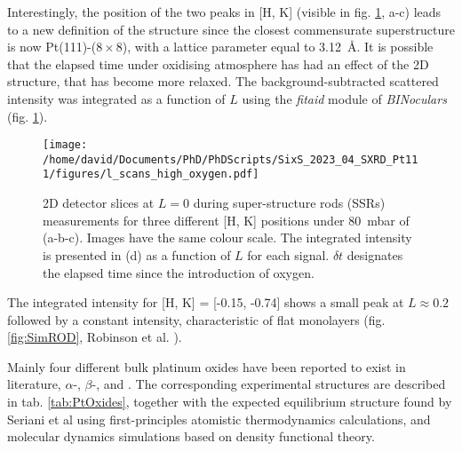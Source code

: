 Interestingly, the position of the two peaks in [H, K] (visible in fig. \ref{fig:LScans80}, a-c) leads to a new definition of the structure since the closest commensurate superstructure is now Pt(111)-($8\times8$), with a lattice parameter equal to \qty{3.12}{\angstrom}.
It is possible that the elapsed time under oxidising atmosphere has had an effect of the 2D structure, that has become more relaxed.
The background-subtracted scattered intensity was integrated as a function of $L$ using the \textit{fitaid} module of \textit{BINoculars} (fig. \ref{fig:LScans80}).

\begin{figure}[!htb]
    \centering
    \texttt{[image: /home/david/Documents/PhD/PhDScripts/SixS\_2023\_04\_SXRD\_Pt111/figures/l\_scans\_high\_oxygen.pdf]}
    \caption{
        2D detector slices at $L=0$ during super-structure rods (SSRs) measurements for three different [H, K] positions under \qty{80}{\milli\bar} of  (a-b-c).
        Images have the same colour scale.
        The integrated intensity is presented in (d) as a function of $L$ for each signal.
        $\delta t$ designates the elapsed time since the introduction of oxygen.
    }
    \label{fig:LScans80}
\end{figure}

The integrated intensity for [H, K] = [-0.15, -0.74] shows a small peak at $L\approx 0.2$ followed by a constant intensity, characteristic of flat monolayers (fig. \ref{fig:SimROD}, Robinson et al. \cite*{Robinson1991}).

Mainly four different bulk platinum oxides have been reported to exist in literature, $\alpha$-, $\beta$-,  and .
The corresponding experimental structures are described in tab. \ref{tab:PtOxides}, together with the expected equilibrium structure found by Seriani et al \parencite*{Seriani2006, Seriani2008} using first-principles atomistic thermodynamics calculations, and molecular dynamics simulations based on density functional theory.

